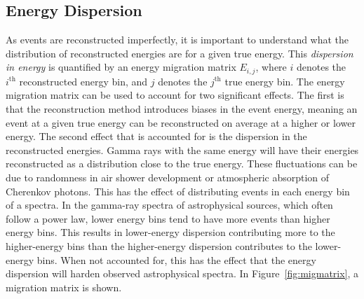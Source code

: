   \FloatBarrier

  \subsection{Energy Dispersion}\label{subsec:edisp}
    As events are reconstructed imperfectly, it is important to understand what the distribution of reconstructed energies are for a given true energy.
    This \textit{dispersion in energy} is quantified by an energy migration matrix $E_{i,j}$, where $i$ denotes the $i^{\text{th}}$ reconstructed energy bin, and $j$ denotes the $j^{\text{th}}$ true energy bin.
    The energy migration matrix can be used to account for two significant effects.
    The first is that the reconstruction method introduces biases in the event energy, meaning an event at a given true energy can be reconstructed on average at a higher or lower energy.
    The second effect that is accounted for is the dispersion in the reconstructed energies.
    Gamma rays with the same energy will have their energies reconstructed as a distribution close to the true energy.
    These fluctuations can be due to randomness in air shower development or atmospheric absorption of Cherenkov photons.
    This has the effect of distributing events in each energy bin of a spectra.
    In the gamma-ray spectra of astrophysical sources, which often follow a power law, lower energy bins tend to have more events than higher energy bins.
    This results in lower-energy dispersion contributing more to the higher-energy bins than the higher-energy dispersion contributes to the lower-energy bins.
    When not accounted for, this has the effect that the energy dispersion will harden observed astrophysical spectra.
    In Figure~\ref{fig:migmatrix}, a migration matrix is shown.

